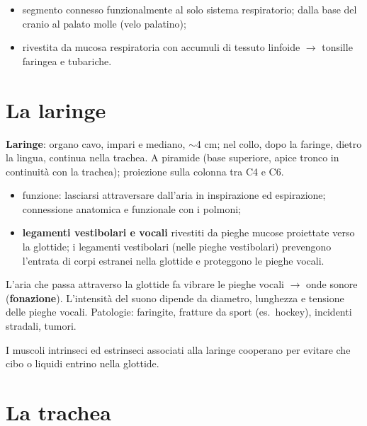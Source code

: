\begin{itemize}
  \item segmento connesso funzionalmente al solo sistema respiratorio; dalla base del cranio al
    palato molle (velo palatino);
  \item rivestita da mucosa respiratoria con accumuli di tessuto linfoide $\rightarrow$ tonsille
    faringea e tubariche.
\end{itemize}

\section{La laringe}

\textbf{Laringe}: organo cavo, impari e mediano, $\sim$4 cm; nel collo, dopo la faringe, dietro la
lingua, continua nella trachea. A piramide (base superiore, apice tronco in continuità con la
trachea); proiezione sulla colonna tra C4 e C6.
\begin{itemize}
  \item funzione: lasciarsi attraversare dall'aria in inspirazione ed espirazione; connessione
    anatomica e funzionale con i polmoni;
  \item \textbf{legamenti vestibolari e vocali} rivestiti da pieghe mucose proiettate verso la
    glottide; i legamenti vestibolari (nelle pieghe vestibolari) prevengono l'entrata di corpi
    estranei nella glottide e proteggono le pieghe vocali.
\end{itemize}

L'aria che passa attraverso la glottide fa vibrare le pieghe vocali $\rightarrow$ onde sonore
(\textbf{fonazione}). L'intensità del suono dipende da diametro, lunghezza e tensione delle pieghe
vocali. Patologie: faringite, fratture da sport (es.\ hockey), incidenti stradali, tumori.

I muscoli intrinseci ed estrinseci associati alla laringe cooperano per evitare che cibo o liquidi
entrino nella glottide.

\section{La trachea}

